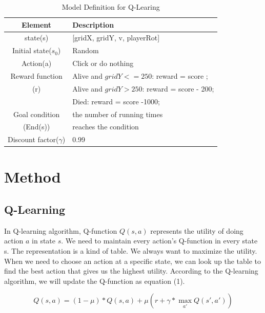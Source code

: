 \documentclass[conference,compsoc]{IEEEtran}
\begin{document}
\begin{table}[!t]
\renewcommand{\arraystretch}{1.3}
\caption{Model Definition for Q-Learing}
\label{table_3}
\centering
\begin{tabular}{|c|p{150pt}|}
\hline
Element & Description\\
\hline
state(s) & [gridX, gridY, v, playerRot]
\\
\hline
Initial state(${s_0}$)&Random 
\\
\hline
Action(a) & Click or do nothing\\
\hline
Reward function & Alive and ${gridY <= 250}$: reward = score ;\\
 (r) & Alive and ${gridY > 250}$: reward = score - 200;\\
  & Died: reward = score -1000;\\
\hline
Goal condition & the number of running times\\
(End(s))&  reaches the condition\\
\hline
Discount factor(${\gamma}$) & 0.99 \\
\hline
\end{tabular}
\end{table}

\section{Method}

\subsection{Q-Learning}

In Q-learning algorithm, Q-function ${Q(s, a)}$ represents the utility of doing action ${a}$ in state ${s}$. We need to maintain every action’s Q-function in every state s. The representation is a kind of table. We always want to maximize the utility. When we need to choose an action at a specific state, we can look up the table to find the best action that gives us the highest utility. According to the Q-learning algorithm, we will update the Q-function as equation (1).

\begin{equation}
Q(s,a)=(1-\mu)*Q(s,a) + \mu(r+ \gamma * \mathop{max}_{a'}Q(s',a'))
\end{equation}
\end{document}
